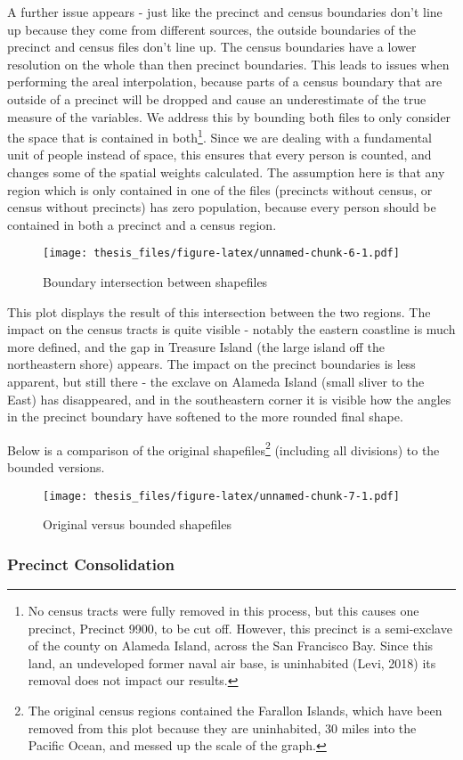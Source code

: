 \documentclass[12pt,twoside]{reedthesis}
\theoremstyle{definition}
\theoremstyle{definition}
\theoremstyle{definition}
\theoremstyle{remark}
\begin{document}
A further issue appears - just like the precinct and census boundaries
don't line up because they come from different sources, the outside
boundaries of the precinct and census files don't line up. The census
boundaries have a lower resolution on the whole than then precinct
boundaries. This leads to issues when performing the areal
interpolation, because parts of a census boundary that are outside of a
precinct will be dropped and cause an underestimate of the true measure
of the variables. We address this by bounding both files to only
consider the space that is contained in both\footnote{No census tracts
  were fully removed in this process, but this causes one precinct,
  Precinct 9900, to be cut off. However, this precinct is a semi-exclave
  of the county on Alameda Island, across the San Francisco Bay. Since
  this land, an undeveloped former naval air base, is uninhabited (Levi,
  2018) its removal does not impact our results.}. Since we are dealing
with a fundamental unit of people instead of space, this ensures that
every person is counted, and changes some of the spatial weights
calculated. The assumption here is that any region which is only
contained in one of the files (precincts without census, or census
without precincts) has zero population, because every person should be
contained in both a precinct and a census region.
\begin{figure}
\centering
\texttt{[image: thesis\_files/figure-latex/unnamed-chunk-6-1.pdf]}
\caption{\label{fig:unnamed-chunk-6}Boundary intersection between
shapefiles}
\end{figure}
This plot displays the result of this intersection between the two
regions. The impact on the census tracts is quite visible - notably the
eastern coastline is much more defined, and the gap in Treasure Island
(the large island off the northeastern shore) appears. The impact on the
precinct boundaries is less apparent, but still there - the exclave on
Alameda Island (small sliver to the East) has disappeared, and in the
southeastern corner it is visible how the angles in the precinct
boundary have softened to the more rounded final shape.

Below is a comparison of the original shapefiles\footnote{The original
  census regions contained the Farallon Islands, which have been removed
  from this plot because they are uninhabited, 30 miles into the Pacific
  Ocean, and messed up the scale of the graph.} (including all
divisions) to the bounded versions.
\begin{figure}
\centering
\texttt{[image: thesis\_files/figure-latex/unnamed-chunk-7-1.pdf]}
\caption{\label{fig:unnamed-chunk-7}Original versus bounded shapefiles}
\end{figure}
\hypertarget{precinct-consolidation}{%
\subsubsection{Precinct Consolidation}\label{precinct-consolidation}}
\end{document}
